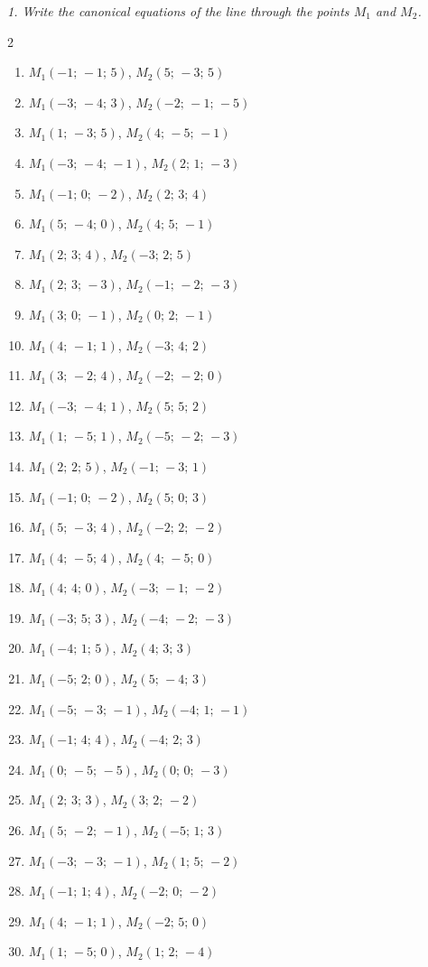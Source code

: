 \emph{1. Write the canonical equations of the line through the points $M_1$ and $M_2$.}
\bigskip
\begin{multicols}{2}\raggedright
\begin{enumerate}[label=\arabic*., leftmargin=*]
\item $M_1(-1;\,-1;\,5)$, $M_2(5;\,-3;\,5)$
\item $M_1(-3;\,-4;\,3)$, $M_2(-2;\,-1;\,-5)$
\item $M_1(1;\,-3;\,5)$, $M_2(4;\,-5;\,-1)$
\item $M_1(-3;\,-4;\,-1)$, $M_2(2;\,1;\,-3)$
\item $M_1(-1;\,0;\,-2)$, $M_2(2;\,3;\,4)$
\item $M_1(5;\,-4;\,0)$, $M_2(4;\,5;\,-1)$
\item $M_1(2;\,3;\,4)$, $M_2(-3;\,2;\,5)$
\item $M_1(2;\,3;\,-3)$, $M_2(-1;\,-2;\,-3)$
\item $M_1(3;\,0;\,-1)$, $M_2(0;\,2;\,-1)$
\item $M_1(4;\,-1;\,1)$, $M_2(-3;\,4;\,2)$
\item $M_1(3;\,-2;\,4)$, $M_2(-2;\,-2;\,0)$
\item $M_1(-3;\,-4;\,1)$, $M_2(5;\,5;\,2)$
\item $M_1(1;\,-5;\,1)$, $M_2(-5;\,-2;\,-3)$
\item $M_1(2;\,2;\,5)$, $M_2(-1;\,-3;\,1)$
\item $M_1(-1;\,0;\,-2)$, $M_2(5;\,0;\,3)$
\item $M_1(5;\,-3;\,4)$, $M_2(-2;\,2;\,-2)$
\item $M_1(4;\,-5;\,4)$, $M_2(4;\,-5;\,0)$
\item $M_1(4;\,4;\,0)$, $M_2(-3;\,-1;\,-2)$
\item $M_1(-3;\,5;\,3)$, $M_2(-4;\,-2;\,-3)$
\item $M_1(-4;\,1;\,5)$, $M_2(4;\,3;\,3)$
\item $M_1(-5;\,2;\,0)$, $M_2(5;\,-4;\,3)$
\item $M_1(-5;\,-3;\,-1)$, $M_2(-4;\,1;\,-1)$
\item $M_1(-1;\,4;\,4)$, $M_2(-4;\,2;\,3)$
\item $M_1(0;\,-5;\,-5)$, $M_2(0;\,0;\,-3)$
\item $M_1(2;\,3;\,3)$, $M_2(3;\,2;\,-2)$
\item $M_1(5;\,-2;\,-1)$, $M_2(-5;\,1;\,3)$
\item $M_1(-3;\,-3;\,-1)$, $M_2(1;\,5;\,-2)$
\item $M_1(-1;\,1;\,4)$, $M_2(-2;\,0;\,-2)$
\item $M_1(4;\,-1;\,1)$, $M_2(-2;\,5;\,0)$
\item $M_1(1;\,-5;\,0)$, $M_2(1;\,2;\,-4)$
\end{enumerate}
\end{multicols}

